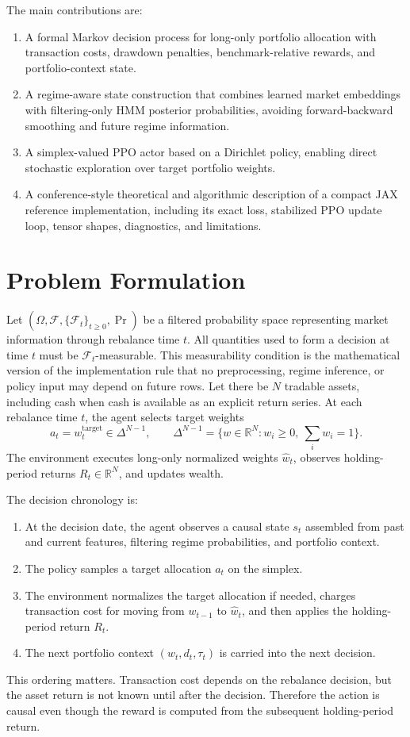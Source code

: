 \documentclass[11pt]{article}
\newcommand{\simplex}{\Delta^{N-1}}
\newcommand{\R}{\mathbb{R}}
\newcommand{\1}{\mathbf{1}}
\begin{document}
The main contributions are:
\begin{enumerate}[leftmargin=*]
  \item A formal Markov decision process for long-only portfolio allocation with
  transaction costs, drawdown penalties, benchmark-relative rewards, and
  portfolio-context state.
  \item A regime-aware state construction that combines learned market embeddings
  with filtering-only HMM posterior probabilities, avoiding forward-backward
  smoothing and future regime information.
  \item A simplex-valued PPO actor based on a Dirichlet policy, enabling direct
  stochastic exploration over target portfolio weights.
  \item A conference-style theoretical and algorithmic description of a compact
  JAX reference implementation, including its exact loss, stabilized PPO update
  loop, tensor shapes, diagnostics, and limitations.
\end{enumerate}

\section{Problem Formulation}

Let $(\Omega,\mathcal{F},\{\mathcal{F}_t\}_{t\ge0},\Pr)$ be a filtered
probability space representing market information through rebalance time $t$.
All quantities used to form a decision at time $t$ must be
$\mathcal{F}_t$-measurable. This measurability condition is the mathematical
version of the implementation rule that no preprocessing, regime inference, or
policy input may depend on future rows. Let there be $N$ tradable assets,
including cash when cash is available as an explicit return series. At each
rebalance time $t$, the agent selects target weights
\[
a_t = w^{\mathrm{target}}_t \in \simplex,
\qquad
\simplex = \{w \in \R^N : w_i \ge 0,\ \sum_i w_i = 1\}.
\]
The environment executes long-only normalized weights $\hat{w}_t$, observes
holding-period returns $R_t \in \R^N$, and updates wealth.

The decision chronology is:
\begin{enumerate}[leftmargin=*]
  \item At the decision date, the agent observes a causal state $s_t$ assembled
  from past and current features, filtering regime probabilities, and portfolio
  context.
  \item The policy samples a target allocation $a_t$ on the simplex.
  \item The environment normalizes the target allocation if needed, charges
  transaction cost for moving from $w_{t-1}$ to $\hat{w}_t$, and then applies
  the holding-period return $R_t$.
  \item The next portfolio context $(w_t,d_t,\tau_t)$ is carried into the next
  decision.
\end{enumerate}
This ordering matters. Transaction cost depends on the rebalance decision, but
the asset return is not known until after the decision. Therefore the action is
causal even though the reward is computed from the subsequent holding-period
return.
\end{document}
